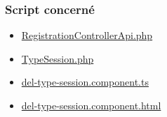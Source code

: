 \subsubsection{Script concerné}
	\begin{itemize}
		\item \href{https://github.com/victorsmits/Aquabike/blob/master/backend/src/Controller/API/RegistrationControllerApi.php}{RegistrationControllerApi.php}
		\item \href{https://github.com/victorsmits/Aquabike/blob/master/backend/src/Entity/TypeSession.php}{TypeSession.php}
		\item \href{https://github.com/victorsmits/Aquabike/blob/master/frontend/src/app/type-session/del-type-session.component.ts}{del-type-session.component.ts}
		\item \href{https://github.com/victorsmits/Aquabike/blob/master/frontend/src/app/type-session/del-type-session.component.html}{del-type-session.component.html}
	\end{itemize}
